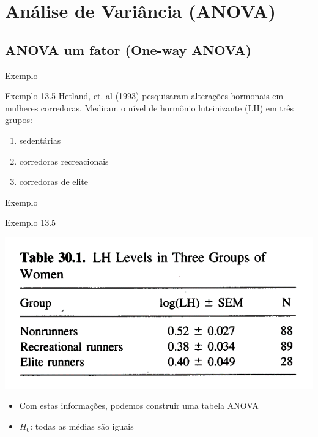 \documentclass{beamer}
\begin{document}

\section[ANOVA]{Análise de Variância (ANOVA)}

\subsection{ANOVA um fator (One-way ANOVA)}

\begin{frame}[label=exemplo13.5]{Exemplo}
  \begin{exampleblock}{Exemplo 13.5}
    Hetland, et. al (1993) pesquisaram alterações hormonais em mulheres corredoras.
    Mediram o nível de hormônio luteinizante (LH) em três grupos:
    \begin{enumerate}
    \item sedentárias
    \item corredoras recreacionais
    \item corredoras de elite
    \end{enumerate}
  \end{exampleblock}
\end{frame}

\begin{frame}{Exemplo}
  \begin{exampleblock}{Exemplo 13.5}
    \begin{center}
      \includegraphics[width=.6\textwidth]{Cap13-30/exemplo13_5-1}
    \end{center}
  \begin{itemize}
  \item Com estas informações, podemos construir uma tabela ANOVA
  \item $H_0$: todas as médias são iguais
  \end{itemize}
  \end{exampleblock}
\end{frame}
\end{document}
